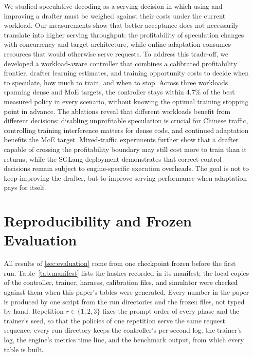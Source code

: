 \documentclass{article}
\begin{document}
We studied speculative decoding as a serving decision in which using and improving a drafter must be weighed against their costs under the current workload. Our measurements show that better acceptance does not necessarily translate into higher serving throughput: the profitability of speculation changes with concurrency and target architecture, while online adaptation consumes resources that would otherwise serve requests. To address this trade-off, we developed a workload-aware controller that combines a calibrated profitability frontier, drafter learning estimates, and training opportunity costs to decide when to speculate, how much to train, and when to stop. Across three workloads spanning dense and MoE targets, the controller stays within 4.7\% of the best measured policy in every scenario, without knowing the optimal training stopping point in advance. The ablations reveal that different workloads benefit from different decisions: disabling unprofitable speculation is crucial for Chinese traffic, controlling training interference matters for dense code, and continued adaptation benefits the MoE target. Mixed-traffic experiments further show that a drafter capable of crossing the profitability boundary may still cost more to train than it returns, while the SGLang deployment demonstrates that correct control decisions remain subject to engine-specific execution overheads. 
The goal is not to keep improving the drafter, but to improve serving performance when adaptation pays for itself.





\clearpage
\appendix
{}   %
\FloatBarrier
\section{Reproducibility and Frozen Evaluation}\label{app:manifest}

All results of \cref{sec:evaluation} come from one checkpoint frozen before the first run. Table~\ref{tab:manifest} lists the hashes recorded in its manifest; the local copies of the controller, trainer, harness, calibration files, and simulator were checked against them when this paper's tables were generated. Every number in the paper is produced by one script from the run directories and the frozen files, not typed by hand. Repetition $r\in\{1,2,3\}$ fixes the prompt order of every phase and the trainer's seed, so that the policies of one repetition serve the same request sequence; every run directory keeps the controller's per-second log, the trainer's log, the engine's metrics time line, and the benchmark output, from which every table is built.
\end{document}
